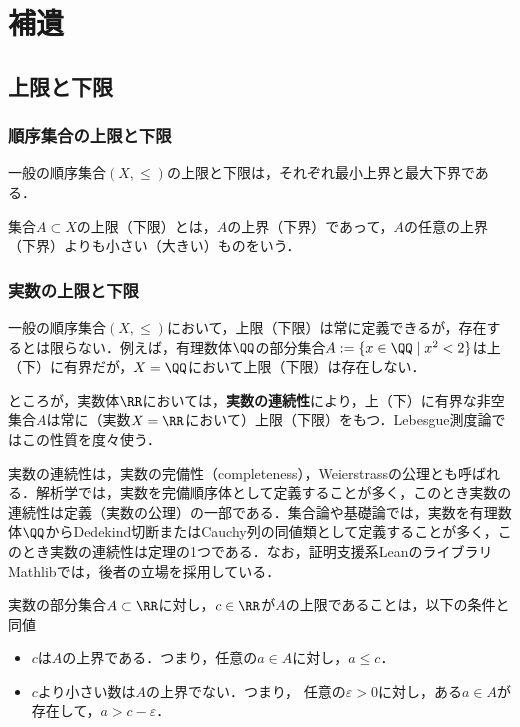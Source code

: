 \chapter{補遺}

\section{上限と下限}

\subsection{順序集合の上限と下限}

一般の順序集合$(X,\le)$の上限と下限は，それぞれ最小上界と最大下界である．
\begin{definition}
    集合$A \subset X$の上限（下限）とは，$A$の上界（下界）であって，$A$の任意の上界（下界）よりも小さい（大きい）ものをいう．
\end{definition}

\subsection{実数の上限と下限}

\begin{remark}
    一般の順序集合$(X,\le)$において，上限（下限）は常に定義できるが，存在するとは限らない．例えば，有理数体$\QQ$の部分集合$A := \{x \in \QQ \mid x^2 < 2\}$は上（下）に有界だが，$X=\QQ$において上限（下限）は存在しない．

    ところが，実数体$\RR$においては，\textbf{実数の連続性}により，上（下）に有界な非空集合$A$は常に（実数$X=\RR$において）上限（下限）をもつ．Lebesgue測度論ではこの性質を度々使う．

    実数の連続性は，実数の完備性（completeness），Weierstrassの公理とも呼ばれる．解析学では，実数を完備順序体として定義することが多く，このとき実数の連続性は定義（実数の公理）の一部である．集合論や基礎論では，実数を有理数体$\QQ$からDedekind切断またはCauchy列の同値類として定義することが多く，このとき実数の連続性は定理の1つである．なお，証明支援系LeanのライブラリMathlibでは，後者の立場を採用している．
\end{remark}

\begin{proposition}[上限の特徴付け]
    実数の部分集合$A \subset \RR$に対し，$c \in \RR$が$A$の上限であることは，以下の条件と同値
    \begin{itemize}
        \item $c$は$A$の上界である．つまり，任意の$a \in A$に対し，$a \le c$．
        \item $c$より小さい数は$A$の上界でない．つまり， 任意の$\varepsilon > 0$に対し，ある$a \in A$が存在して，$a > c - \varepsilon$．
    \end{itemize}
\end{proposition}

